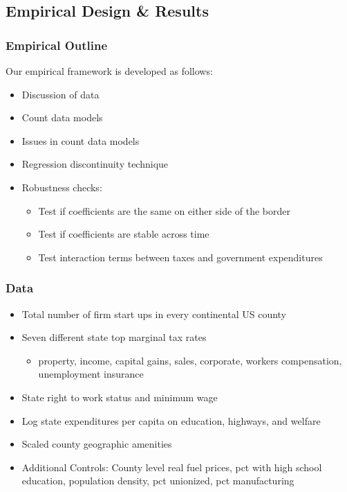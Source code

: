\documentclass{beamer}
\begin{document}
\begin{frame}
\section{Empirical Design \& Results}
\frametitle{Empirical Outline}
Our empirical framework is developed as follows:
\begin{itemize}
\item Discussion of data
\item Count data models
\item Issues in count data models
\item Regression discontinuity technique
\item Robustness checks: 
\begin{itemize}
\item Test if coefficients are the same on either side of the border
\item Test if coefficients are stable across time
\item Test interaction terms between taxes and government expenditures
\end{itemize}
\end{itemize}
\end{frame}

\begin{frame}
\frametitle{Data}
\begin{itemize}
\item Total number of firm start ups in every continental US county
\item Seven different state top marginal tax rates
\begin{itemize}
\item property, income, capital gains, sales, corporate, workers compensation, unemployment insurance
\end{itemize}
\item State right to work status and minimum wage
\item Log state expenditures per capita on education, highways, and welfare
\item Scaled county geographic amenities
\item Additional Controls: County level real fuel prices, pct with high school education, population density, pct unionized, pct manufacturing
\end{itemize}
\end{frame}
\end{document}

